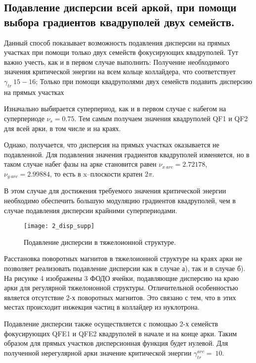 \subsection{Подавление дисперсии всей аркой, при помощи выбора градиентов квадруполей двух семейств.}\label{subsec:transition_variation/methods/disp_supperssion_AS}	

Данный способ показывает возможность подавления дисперсии на прямых участках при помощи только двух семейств фокусирующих квадруполей. 
Тут важно учесть, как и в первом случае выполнить:
	Получение необходимого значения критической энергии на всем кольце коллайдера, что соответствует $\gamma_{tr}~15-16$;
	Только при помощи квадруполями двух семейств подавить дисперсию на прямых участках
	
\par Изначально выбирается суперпериод, как и в первом случае с набегом на суперпериоде $\nu_s=0.75$. Тем самым получаем значения квадруполей QF1 и QF2 для всей арки, в том числе и на краях.
\par Однако, получается, что дисперсия на прямых участках оказывается не подавленной. Для подавления значения градиентов квадруполей изменяется, но в таком случае набег фазы на арке становится равен $\nu_{x\ arc}=2.72178$,\ $\nu_{y\ arc}=2.99884$, то есть в x–плоскости кратен $2\pi$.

\par В этом случае для достижения требуемого значения критической энергии необходимо обеспечить большую модуляцию градиентов квадруполей, чем в случае подавления дисперсии крайними суперпериодами.
	
\begin{figure} [h!]
   \center
   \texttt{[image: 2\_disp\_supp]}
   \caption{Подавление дисперсии в тяжелоионной структуре.}
   \label{fig:2_disp_supp}
\end{figure}

\par Расстановка поворотных магнитов в тяжелоионной структуре на краях арки не позволяет реализовать подавление дисперсии как в случае а), так и в случае б). На рисунке 4 изображены 3 ФОДО ячейки, подавляющие дисперсию на краю арки для регулярной тяжелоионной структуры. Отличительной особенностью является отсутствие 2-х поворотных магнитов. Это связано с тем, что в этих местах происходит инжекция частиц в коллайдер из нуклотрона.
	
\par Подавление дисперсии также осуществляется с помощью 2-х семейств фокусирующих QFE1 и QFE2 квадруполей в начале и на конце арки.  Таким образом для прямых участков дисперсионная функция будет нулевой. Для полученной нерегулярной арки значение критической энергии $\gamma_{tr}^{arc}=\ 10$.

